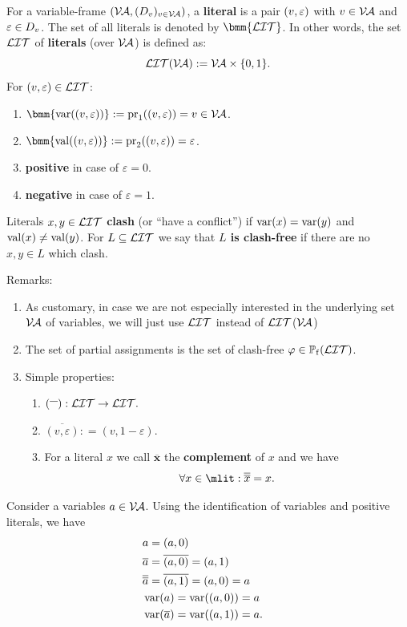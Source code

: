 \documentclass[12pt]{book}
\begin{document}
\begin{defi}\label{def:litdervar}
      For a variable-frame $(\mathcal{V\hspace{-0.1em}A}, (D_v)_{v \in \mathcal{V\hspace{-0.1em}A}})$, a \textbf{literal} is a pair $(v,\varepsilon)$ with $v \in \mathcal{V\hspace{-0.1em}A}$ and $\varepsilon \in D_v$. The set of all literals is denoted by 
	  $\bmm{\Lit}$. In other words, the set $\mathcal{LIT}$ of \textbf{literals} (over $\mathcal{V\hspace{-0.1em}A}$) is defined as:
      $$\mathcal{LIT}( \mathcal{V\hspace{-0.1em}A}): = \mathcal{V\hspace{-0.1em}A} \times \{0,1\}.$$
      For $(v,\varepsilon) \in \mathcal{LIT}$:
      \begin{enumerate}
            \item $\bmm{\var((v,\ve))} := \proj_1((v,\ve)) = v \in \Va$.
            \item $\bmm{\val((v,\ve))} := \proj_2((v,\ve)) = \ve$.
            \item \textbf{positive} in case of $\varepsilon = 0$.
            \item \textbf{negative} in case of $\varepsilon = 1$.
      \end{enumerate}
      Literals $x, y \in \mathcal{LIT}$ \textbf{clash} (or ``have a conflict'') if $\operatorname{var}(x) = \operatorname{var}(y)$ and $\operatorname{val}(x) \ne \operatorname{val}(y)$. For $L \subseteq \mathcal{LIT}$ we say that 
	  \textbf{$L$ is clash-free} if there are no $x, y \in L$ which clash.
\end{defi}
Remarks:
\begin{enumerate}
      \item As customary, in case we are not especially interested in the underlying set   $\mathcal{V\hspace{-0.1em}A}$ of variables, we will just use  $\mathcal{LIT}$ instead of $\mathcal{LIT}$($\mathcal{V\hspace{-0.1em}A}$)
      \item The set of partial assignments is the set of clash-free $\varphi \in \operatorname{\mathbb{P}_f}(\mathcal{LIT})$.
      \item Simple properties:
      \begin{enumerate}
            \item $({}^{\overline{~~}}): \mathcal{LIT} \to  \mathcal{LIT}.$
            \item $\overline{(v, \varepsilon)}: = (v, 1-\varepsilon).$
            \item For a literal $x$ we call $\overline{{\bm x}}$ the \textbf{complement} of $x$ and we have
            $$\forall x \in \mlit: \overline{\overline{x}} = x.$$
      \end{enumerate}
\end{enumerate}
\begin{examp}\label{}
      Consider a variables $a\in  \mathcal{V\hspace{-0.1em}A}$. Using the identification of variables and positive literals, we have
      \begin{eqnarray*}
            &a = (a,0)& \\
            &\overline{a} = \overline{(a,0)} = (a,1)&\\
            &\overline{\overline{a}} = \overline{(a,1)} = (a,0) = a&\\
            &\operatorname{var}(a) = \operatorname{var}((a,0)) = a& \\
            &\operatorname{var}(\overline{a}) = \operatorname{var}((a,1)) = a. &
      \end{eqnarray*}
\end{examp}
\end{document}
